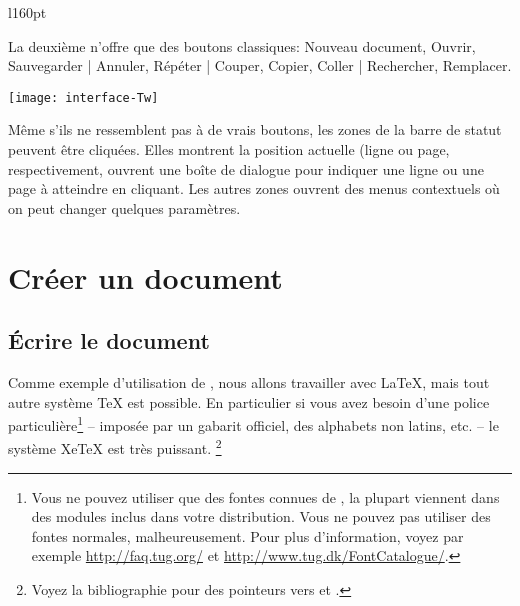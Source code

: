 \begin{wrapfigure}[2]{l}{160pt}
\vspace*{-1em}
\usebox{\inlineimg}
\end{wrapfigure}
\noindent La deuxième n'offre que des boutons classiques: Nouveau document, Ouvrir, Sauvegarder | Annuler, Répéter | Couper, Copier, Coller | Rechercher, Remplacer.

\begin{center}
\texttt{[image: interface-Tw]}
\end{center}

Même s'ils ne ressemblent pas à de vrais boutons, les zones de la barre de statut peuvent être cliquées. Elles montrent la position actuelle (ligne ou page, respectivement, ouvrent une boîte de dialogue pour indiquer une ligne ou une page à atteindre en cliquant. Les autres zones ouvrent des menus contextuels où on peut changer quelques paramètres.


\section{Créer un document}

\subsection{Écrire le document}

Comme exemple d'utilisation de \Tw, nous allons travailler avec \LaTeX{}, mais tout autre système \TeX{} est possible. En particulier si vous avez besoin d'une police particulière\footnote{Vous ne pouvez utiliser que des fontes connues de \AllTeX, la plupart viennent dans des modules inclus dans votre distribution. Vous ne pouvez pas utiliser des fontes \og normales\fg, malheureusement. Pour plus d'information, voyez par exemple \url{http://faq.tug.org/} et \url{http://www.tug.dk/FontCatalogue/}.} -- imposée par un gabarit officiel, des alphabets non latins, etc. -- le système XeTeX est très puissant. \footnote{Voyez la bibliographie pour des pointeurs vers \XeTeX{} et \XeLaTeX.}

